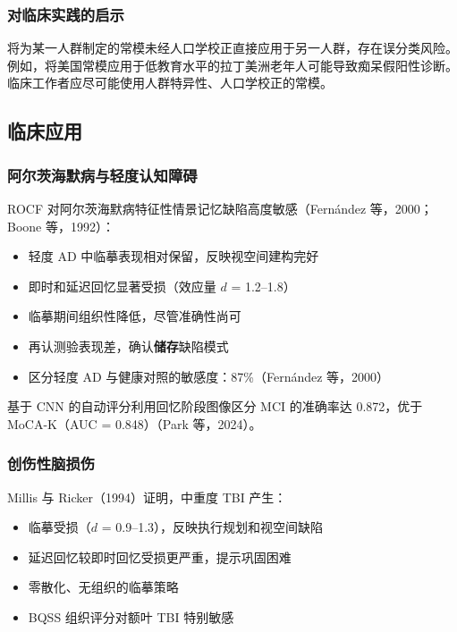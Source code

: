 \documentclass[12pt,a4paper]{ctexart}
\begin{document}
\subsubsection{对临床实践的启示}

将为某一人群制定的常模未经人口学校正直接应用于另一人群，存在误分类风险。例如，将美国常模应用于低教育水平的拉丁美洲老年人可能导致痴呆假阳性诊断。临床工作者应尽可能使用人群特异性、人口学校正的常模。

\subsection{临床应用}

\subsubsection{阿尔茨海默病与轻度认知障碍}

ROCF 对阿尔茨海默病特征性情景记忆缺陷高度敏感（Fernández 等，2000；Boone 等，1992）：

\begin{itemize}
\item 轻度 AD 中临摹表现相对保留，反映视空间建构完好
\item 即时和延迟回忆显著受损（效应量 $d$ = 1.2–1.8）
\item 临摹期间组织性降低，尽管准确性尚可
\item 再认测验表现差，确认\textbf{储存}缺陷模式
\item 区分轻度 AD 与健康对照的敏感度：87\%（Fernández 等，2000）
\end{itemize}

基于 CNN 的自动评分利用回忆阶段图像区分 MCI 的准确率达 0.872，优于 MoCA-K（AUC = 0.848）（Park 等，2024）。

\subsubsection{创伤性脑损伤}

Millis 与 Ricker（1994）证明，中重度 TBI 产生：

\begin{itemize}
\item 临摹受损（$d$ = 0.9–1.3），反映执行规划和视空间缺陷
\item 延迟回忆较即时回忆受损更严重，提示巩固困难
\item 零散化、无组织的临摹策略
\item BQSS 组织评分对额叶 TBI 特别敏感
\end{itemize}
\end{document}
